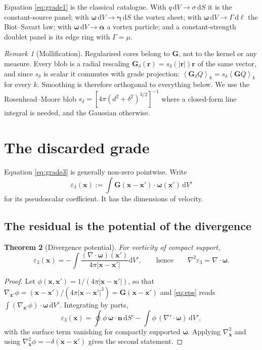 \documentclass[preprint,12pt,3p]{elsarticle}
\newtheorem{theorem}{Theorem}
\theoremstyle{remark}
\newtheorem{remark}[theorem]{Remark}
\newcommand{\grade}[2]{\left\langle #1 \right\rangle_{#2}}
\newcommand{\eps}{\varepsilon_3}
\newcommand{\dd}{\mathrm{d}}
\newcommand{\bx}{\mathbf{x}}
\newcommand{\br}{\mathbf{r}}
\newcommand{\bn}{\mathbf{n}}
\newcommand{\bG}{\mathbf{G}}
\newcommand{\bomega}{\boldsymbol{\omega}}
\newcommand{\balpha}{\boldsymbol{\alpha}}
\newcommand{\bgamma}{\boldsymbol{\gamma}}
\begin{document}
Equation \eqref{eq:grade1} is the classical catalogue. With
$q\,\dd V\to\sigma\,\dd S$ it is the constant-source panel; with
$\bomega\,\dd V\to\bgamma\,\dd S$ the vortex sheet; with
$\bomega\,\dd V\to\Gamma\,\dd\boldsymbol{\ell}$ the Biot--Savart law; with
$\bomega\,\dd V\to\balpha$ a vortex particle; and a constant-strength doublet
panel is its edge ring with $\Gamma=\mu$.

\begin{remark}[Mollification]
\label{rem:moll}
Regularised cores belong to $\bG$, not to the kernel or any measure. Every blob
is a radial rescaling $\bG_\delta(\br) = s_\delta(|\br|)\br$ of the same vector,
and since $s_\delta$ is scalar it commutes with grade projection:
$\grade{\bG_\delta Q}{k} = s_\delta\grade{\bG Q}{k}$ for every $k$. Smoothing is
therefore orthogonal to everything below. We use the Rosenhead--Moore blob
$s_\delta = [4\pi(d^2+\delta^2)^{3/2}]^{-1}$ where a closed-form line integral
is needed, and the Gaussian otherwise.
\end{remark}

\section{The discarded grade}
\label{sec:theory}

Equation \eqref{eq:grade3} is generally non-zero pointwise. Write
\begin{equation}
  \eps(\bx) := \int \bG(\bx-\bx')\cdot\bomega(\bx')\,\dd V'
  \label{eq:eps}
\end{equation}
for its pseudoscalar coefficient. It has the dimensions of velocity.

\subsection{The residual is the potential of the divergence}

\begin{theorem}[Divergence potential]
\label{thm:C}
For vorticity of compact support,
\begin{equation}
  \eps(\bx) = -\int \frac{(\nabla\cdot\bomega)(\bx')}{4\pi|\bx-\bx'|}\dd V' ,
  \qquad\text{hence}\qquad \nabla^2\eps = \nabla\cdot\bomega .
\end{equation}
\end{theorem}

\begin{proof}
Let $\phi(\bx,\bx') = 1/(4\pi|\bx-\bx'|)$, so that
$\nabla_{\bx'}\phi = (\bx-\bx')/(4\pi|\bx-\bx'|^3) = \bG(\bx-\bx')$ and
\eqref{eq:eps} reads $\int(\nabla_{\bx'}\phi)\cdot\bomega\,\dd V'$. Integrating
by parts,
\[
  \eps(\bx) = \oint \phi\,\bomega\cdot\bn\,\dd S'
            - \int \phi\,(\nabla'\!\cdot\bomega)\,\dd V' ,
\]
with the surface term vanishing for compactly supported $\bomega$. Applying
$\nabla^2_{\bx}$ and using $\nabla^2_{\bx}\phi = -\delta(\bx-\bx')$ gives the
second statement.
\end{proof}
\end{document}
